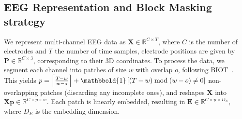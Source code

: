 \documentclass{article}
\begin{document}
\subsection{EEG Representation and Block Masking strategy}
\label{subsec:patching}
\label{subsec:mask-strat}


We represent multi-channel EEG data as $\mathbf{X} \in \mathbb{R}^{C \times T}$, where $C$ is the number of electrodes and $T$ the number of time samples, electrode positions are given by $\mathbf{P} \in \mathbb{R}^{C \times 3}$, corresponding to their 3D coordinates. To process the data, we segment each channel into patches of size $w$ with overlap $o$, following BIOT~\citep{yang2024biot}. This yields $p = \left\lceil \frac{T - w}{w - o} \right\rceil + \mathbbold{1} \left[ (T - w) \bmod (w - o) \neq 0 \right]$ non-overlapping patches (discarding any incomplete ones), and reshapes $\mathbf{X}$ into $\mathbf{Xp} \in \mathbb{R}^{C \times p \times w}$. Each patch is linearly embedded, resulting in $\mathbf{E} \in \mathbb{R}^{C \times p \times D_E}$, where $D_E$ is the embedding dimension.


\end{document}
